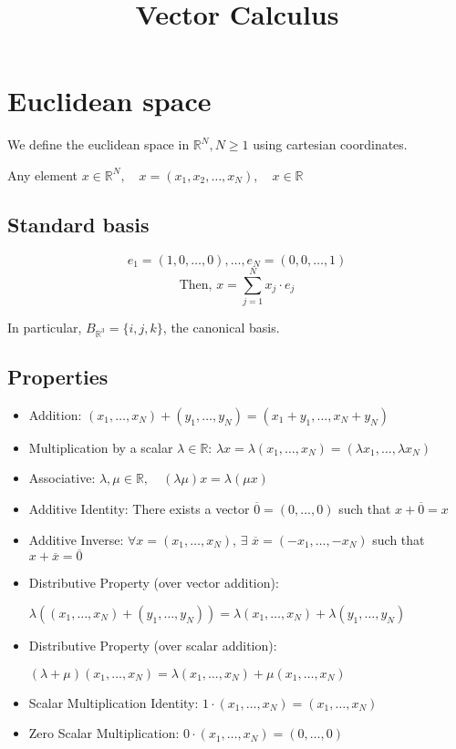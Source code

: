\documentclass[11pt]{article}
\title{\textbf{Vector Calculus}}
\author{}
\date{}
\begin{document}
\maketitle

\section{Euclidean space}
We define the euclidean space in $\mathbb{R}^N, N \geq 1$ using cartesian coordinates.

Any element $x \in \mathbb{R}^N, \quad x = (x_1,x_2, \dots , x_N), \quad x \in \mathbb{R}$

\subsection*{Standard basis}
\[
e_1 = (1,0, \dots ,0), \dots , e_N = (0,0, \dots ,1)
\]
\[
\text{Then, } x = \sum_{j = 1}^{N} x_j \cdot e_j
\]

In particular, $B_{\mathbb{R}^3} = \{i,j,k\}$, the canonical basis.

\subsection*{Properties}
\begin{itemize}
    \item Addition: \quad $(x_1, \dots ,x_N) + (y_1, \dots , y_N) = (x_1 + y_1, \dots , x_N + y_N)$
    \item Multiplication by a scalar $\lambda \in \mathbb{R}$: \quad $\lambda x = \lambda (x_1, \dots , x_N) = (\lambda x_1, \dots , \lambda x_N)$
    \item Associative: \quad $\lambda, \mu \in \mathbb{R}, \quad (\lambda \mu)x = \lambda(\mu x)$
    \item Additive Identity: \quad There exists a vector $\overline{0} = (0, \dots , 0)$ such that $x + \overline{0} = x$
    \item Additive Inverse: \quad $\forall x = (x_1, \dots , x_N)$, $\exists$  $\overline{x} = (-x_1, \dots , -x_N)$ such that $x + \overline{x} = \overline{0}$
    \item Distributive Property (over vector addition): 
    \begin{center}
        $\lambda \left( (x_1, \dots , x_N) + (y_1, \dots , y_N) \right) = \lambda(x_1, \dots , x_N) + \lambda(y_1, \dots , y_N)$
    \end{center} 
    \item Distributive Property (over scalar addition): 
    \begin{center}
        $(\lambda + \mu)(x_1, \dots , x_N) = \lambda(x_1, \dots , x_N) + \mu(x_1, \dots , x_N)$
    \end{center}
    \item Scalar Multiplication Identity: \quad $1 \cdot (x_1, \dots , x_N) = (x_1, \dots , x_N)$
    \item Zero Scalar Multiplication: \quad $0 \cdot (x_1, \dots , x_N) = (0, \dots , 0)$
\end{itemize}
\end{document}
